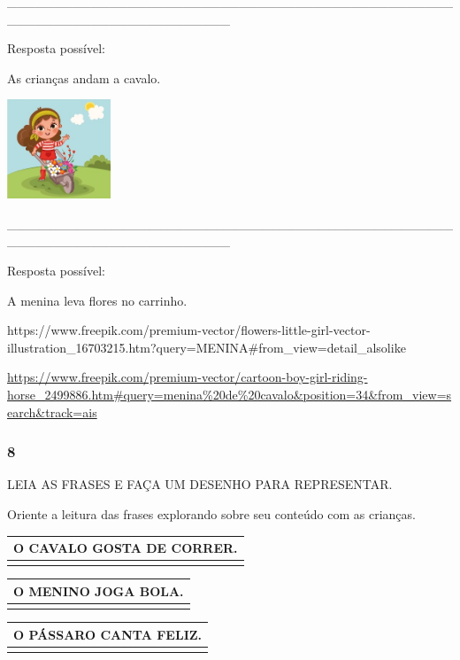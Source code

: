 \_\_\_\_\_\_\_\_\_\_\_\_\_\_\_\_\_\_\_\_\_\_\_\_\_\_\_\_\_\_\_\_\_\_\_\_\_\_\_\_\_\_\_\_\_\_\_\_\_\_\_\_\_\_\_\_\_\_\_\_\_\_\_\_\_\_\_\_\_\_\_\_

Resposta possível:

As crianças andam a cavalo.

\includegraphics[width=1.21656in,height=1.16552in]{media/image68.jpeg}

\_\_\_\_\_\_\_\_\_\_\_\_\_\_\_\_\_\_\_\_\_\_\_\_\_\_\_\_\_\_\_\_\_\_\_\_\_\_\_\_\_\_\_\_\_\_\_\_\_\_\_\_\_\_\_\_\_\_\_\_\_\_\_\_\_\_\_\_\_\_\_\_

Resposta possível:

A menina leva flores no carrinho.

https://www.freepik.com/premium-vector/flowers-little-girl-vector-illustration\_16703215.htm?query=MENINA\#from\_view=detail\_alsolike

\url{https://www.freepik.com/premium-vector/cartoon-boy-girl-riding-horse_2499886.htm\#query=menina\%20de\%20cavalo\&position=34\&from_view=search\&track=ais}

\subsubsection{8 }\label{section-22}

LEIA AS FRASES E FAÇA UM DESENHO PARA REPRESENTAR.

Oriente a leitura das frases explorando sobre seu conteúdo com as
crianças.

\begin{longtable}[]{@{}l@{}}
\toprule
O CAVALO GOSTA DE CORRER.\tabularnewline
\midrule
\endhead
\tabularnewline
\bottomrule
\end{longtable}

\begin{longtable}[]{@{}l@{}}
\toprule
O MENINO JOGA BOLA.\tabularnewline
\midrule
\endhead
\tabularnewline
\bottomrule
\end{longtable}

\begin{longtable}[]{@{}l@{}}
\toprule
O PÁSSARO CANTA FELIZ.\tabularnewline
\midrule
\endhead
\tabularnewline
\bottomrule
\end{longtable}

